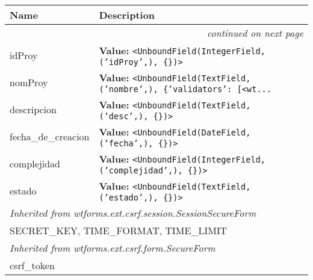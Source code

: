     \vspace{-1cm}
\hspace{\varindent}\begin{longtable}{|p{\varnamewidth}|p{\vardescrwidth}|l}
\cline{1-2}
\cline{1-2} \centering \textbf{Name} & \centering \textbf{Description}& \\
\cline{1-2}
\endhead\cline{1-2}\multicolumn{3}{r}{\small\textit{continued on next page}}\\\endfoot\cline{1-2}
\endlastfoot\raggedright i\-d\-P\-r\-o\-y\- & \raggedright \textbf{Value:} 
{\tt {\textless}UnboundField(IntegerField, ('idProy',), \{\}){\textgreater}}&\\
\cline{1-2}
\raggedright n\-o\-m\-P\-r\-o\-y\- & \raggedright \textbf{Value:} 
{\tt {\textless}UnboundField(TextField, ('nombre',), \{'validators': [{\textless}wt\texttt{...}}&\\
\cline{1-2}
\raggedright d\-e\-s\-c\-r\-i\-p\-c\-i\-o\-n\- & \raggedright \textbf{Value:} 
{\tt {\textless}UnboundField(TextField, ('desc',), \{\}){\textgreater}}&\\
\cline{1-2}
\raggedright f\-e\-c\-h\-a\-\_\-d\-e\-\_\-c\-r\-e\-a\-c\-i\-o\-n\- & \raggedright \textbf{Value:} 
{\tt {\textless}UnboundField(DateField, ('fecha',), \{\}){\textgreater}}&\\
\cline{1-2}
\raggedright c\-o\-m\-p\-l\-e\-j\-i\-d\-a\-d\- & \raggedright \textbf{Value:} 
{\tt {\textless}UnboundField(IntegerField, ('complejidad',), \{\}){\textgreater}}&\\
\cline{1-2}
\raggedright e\-s\-t\-a\-d\-o\- & \raggedright \textbf{Value:} 
{\tt {\textless}UnboundField(TextField, ('estado',), \{\}){\textgreater}}&\\
\cline{1-2}
\multicolumn{2}{|l|}{\textit{Inherited from wtforms.ext.csrf.session.SessionSecureForm}}\\
\multicolumn{2}{|p{\varwidth}|}{\raggedright SECRET\_KEY, TIME\_FORMAT, TIME\_LIMIT}\\
\cline{1-2}
\multicolumn{2}{|l|}{\textit{Inherited from wtforms.ext.csrf.form.SecureForm}}\\
\multicolumn{2}{|p{\varwidth}|}{\raggedright csrf\_token}\\
\cline{1-2}
\end{longtable}




